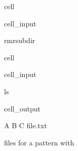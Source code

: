 \documentclass[a4paper,10pt,english]{jupyterBook}
\begin{document}
\begin{sphinxuseclass}{cell}\begin{sphinxVerbatimInput}

\begin{sphinxuseclass}{cell_input}
\begin{sphinxVerbatim}[commandchars=\\\{\}]
rm\PYGZhy{}rsubdir
\end{sphinxVerbatim}

\end{sphinxuseclass}\end{sphinxVerbatimInput}

\end{sphinxuseclass}
\begin{sphinxuseclass}{cell}\begin{sphinxVerbatimInput}

\begin{sphinxuseclass}{cell_input}
\begin{sphinxVerbatim}[commandchars=\\\{\}]
ls
\end{sphinxVerbatim}

\end{sphinxuseclass}\end{sphinxVerbatimInput}
\begin{sphinxVerbatimOutput}

\begin{sphinxuseclass}{cell_output}
\begin{sphinxVerbatim}[commandchars=\\\{\}]
A  B  C  file.txt
\end{sphinxVerbatim}

\end{sphinxuseclass}\end{sphinxVerbatimOutput}

\end{sphinxuseclass}
\sphinxAtStartPar
{} files for a pattern with 
\end{document}
